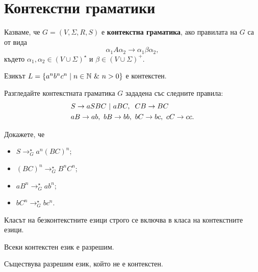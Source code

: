 \section{Контекстни граматики}

Казваме, че $G = (V,\Sigma,R,S)$ е {\bf контекстна граматика}, ако правилата на $G$ са от вида
\[\alpha_1 A \alpha_2 \to \alpha_1 \beta \alpha_2,\]
където $\alpha_1,\alpha_2 \in (V\cup\Sigma)^\star$ и $\beta \in (V\cup\Sigma)^+$.

\begin{problem}
  Езикът $L = \{a^nb^nc^n \mid n \in \Nat\ \&\ n > 0\}$ е контекстен.
\end{problem}
\begin{hint}
  Разгледайте контекстната граматика $G$ зададена със следните правила:
  \begin{align*}
    & S \to aSBC\ |\ aBC,\hspace*{0.2cm} CB \to BC\\
    & aB \to ab,\ bB \to bb,\ bC \to bc,\ cC \to cc.
  \end{align*}

  Докажете, че
  \begin{itemize}
  \item
    $S \to^\star_Ga^n(BC)^n$;
  \item
    $(BC)^n \to^\star_G B^nC^n$;
  \item
    $aB^n \to^\star_G ab^n$;
  \item
    $bC^n \to^\star_G bc^n$.
  \end{itemize}
\end{hint}

\begin{proposition}
  Класът на безконтекстните езици строго се включва в класа на контекстните езици.
\end{proposition}

\begin{proposition}
  Всеки контекстен език е разрешим.
\end{proposition}

\begin{proposition}
  Съществува разрешим език, който не е контекстен.
\end{proposition}


